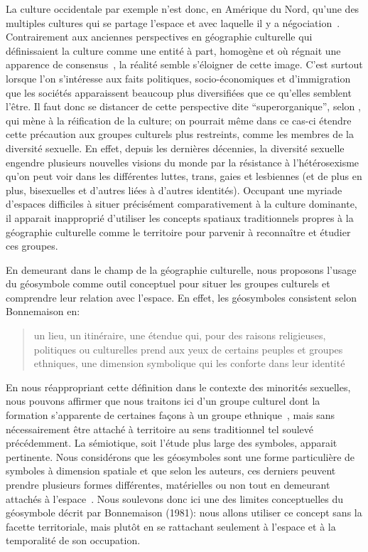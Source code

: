 La culture occidentale par exemple n'est donc, en Amérique du Nord, qu'une des multiples cultures qui se partage l'espace et avec laquelle il y a négociation~\citep[11]{Duncan1993}.
Contrairement aux anciennes perspectives en géographie culturelle qui définissaient la culture comme une entité à part, homogène et où régnait une apparence de consensus~\citep{Duncan1980}, la réalité semble s'éloigner de cette image.
C'est surtout lorsque l'on s'intéresse aux faits politiques, socio-économiques et d'immigration que les sociétés apparaissent beaucoup plus diversifiées que ce qu'elles semblent l'être.
Il faut donc se distancer de cette perspective dite \enquote{superorganique}, selon \citet[198]{Duncan1980}, qui mène à la réification de la culture; on pourrait même dans ce cas-ci étendre cette précaution aux groupes culturels plus restreints, comme les membres de la diversité sexuelle.
En effet, depuis les dernières décennies, la diversité sexuelle engendre plusieurs nouvelles visions du monde par la résistance à l'hétérosexisme qu'on peut voir dans les différentes luttes, trans,  gaies et lesbiennes (et de plus en plus, bisexuelles et d'autres liées à d'autres identités).
Occupant une myriade d'espaces difficiles à situer précisément comparativement à la culture dominante, il apparait inapproprié d'utiliser les concepts spatiaux traditionnels propres à la géographie culturelle comme le territoire pour parvenir à reconnaître et étudier ces groupes.

En demeurant dans le champ de la géographie culturelle, nous proposons l'usage du géosymbole comme outil conceptuel pour situer les groupes culturels et comprendre leur relation avec l'espace.
En effet, les géosymboles consistent selon Bonnemaison en: \blockquote[{\cite[256]{Bonnemaison1981}}][.]{\textelp{} un lieu, un  itinéraire, une étendue qui, pour des raisons religieuses, politiques ou   culturelles prend aux yeux de certains peuples et groupes ethniques, une   dimension symbolique qui les conforte dans leur identité }.
En nous réappropriant cette définition dans le contexte des minorités sexuelles, nous pouvons affirmer que nous traitons ici d'un groupe culturel dont la formation s'apparente de certaines façons à un groupe ethnique~\citep{Sinfield1996}, mais sans nécessairement être attaché à territoire au sens traditionnel tel soulevé précédemment.
La sémiotique, soit l'étude plus large des symboles, apparait pertinente.
Nous considérons que les géosymboles sont une forme particulière de symboles à dimension spatiale et que selon les auteurs, ces derniers peuvent prendre plusieurs formes différentes, matérielles ou non tout en demeurant attachés à l'espace~\citep{Bonnemaison1981,Bedard2002}.
Nous soulevons donc ici une des limites conceptuelles du géosymbole décrit par Bonnemaison (1981): nous allons utiliser ce concept sans la facette territoriale, mais plutôt en se rattachant seulement à l'espace et à la temporalité de son occupation.

